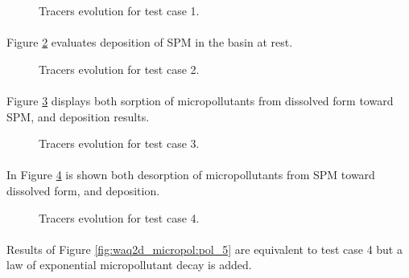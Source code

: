 \begin{figure} [H]
\centering
{}
\caption{Tracers evolution for test case 1.}
 \label{fig:waq2d_micropol:pol_1}
\end{figure}

\paragraph{}
Figure \ref{fig:waq2d_micropol:pol_2} evaluates deposition of SPM in the
basin at rest.

\begin{figure} [H]
\centering
{}
 \caption{Tracers evolution for test case 2.}
 \label{fig:waq2d_micropol:pol_2}
\end{figure}

\paragraph{}
Figure \ref{fig:waq2d_micropol:pol_3} displays both sorption of micropollutants
from dissolved form toward SPM, and deposition results.

\begin{figure} [H]
\centering
{}
\caption{Tracers evolution for test case 3.}
 \label{fig:waq2d_micropol:pol_3}
\end{figure}

\paragraph{}
In Figure \ref{fig:waq2d_micropol:pol_4} is shown both desorption
of micropollutants from SPM toward dissolved form, and deposition.

\begin{figure} [H]
\centering
{}
 \caption{Tracers evolution for test case 4.}
 \label{fig:waq2d_micropol:pol_4}
\end{figure}

\paragraph{}
Results of Figure \ref{fig:waq2d_micropol:pol_5} are equivalent to test
case 4 but a law of exponential micropollutant decay is added.

